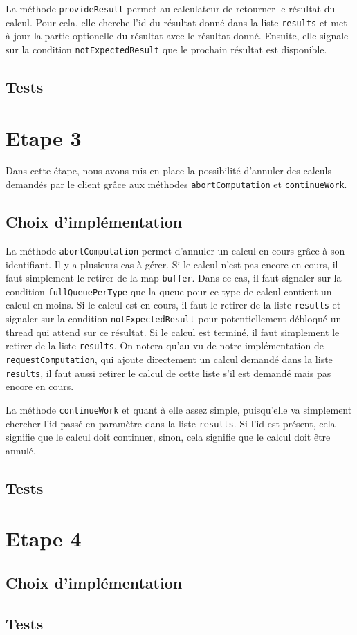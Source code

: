 \documentclass{article}
\begin{document}
La méthode \texttt{provideResult} permet au calculateur de retourner le résultat du calcul. Pour cela, elle cherche
l'id du résultat donné dans la liste \texttt{results} et met à jour la partie optionelle du résultat avec le résultat
donné. Ensuite, elle signale sur la condition \texttt{notExpectedResult} que le prochain résultat est disponible.


\subsection{Tests}

\section{Etape 3}
Dans cette étape, nous avons mis en place la possibilité d’annuler des calculs demandés par le client grâce aux méthodes
\texttt{abortComputation} et \texttt{continueWork}.
\subsection{Choix d'implémentation}
La méthode \texttt{abortComputation} permet d’annuler un calcul en cours grâce à son identifiant. Il y a plusieurs
cas à gérer. Si le calcul n’est pas encore en cours, il faut simplement le retirer de la map \texttt{buffer}. Dans
ce cas, il faut signaler sur la condition \texttt{fullQueuePerType} que la queue pour ce type de calcul contient un
calcul en moins. Si le calcul est en cours, il faut le retirer de la liste \texttt{results} et signaler sur
la condition \texttt{notExpectedResult} pour potentiellement débloqué un thread qui attend sur ce résultat.
Si le calcul est terminé, il faut simplement le retirer de la liste \texttt{results}.
On notera qu'au vu de notre implémentation de \texttt{requestComputation}, qui ajoute directement un calcul demandé
dans la liste \texttt{results}, il faut aussi retirer le calcul de cette liste s'il est demandé mais pas encore en
cours.

La méthode \texttt{continueWork} et quant à elle assez simple, puisqu'elle va simplement chercher l'id passé en
paramètre dans la liste \texttt{results}. Si l'id est présent, cela signifie que le calcul doit continuer, sinon, cela
signifie que le calcul doit être annulé.

\subsection{Tests}

\section{Etape 4}

\subsection{Choix d'implémentation}

\subsection{Tests}
\end{document}
